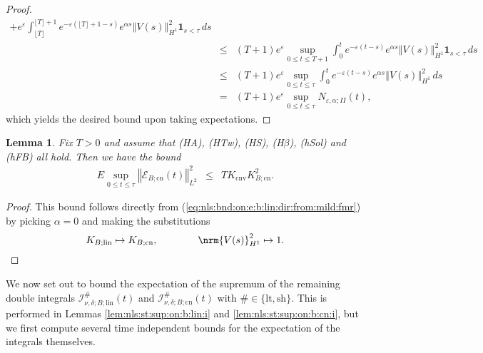 \documentclass[10pt]{articleHJ}
\newcommand{\e}{\ensuremath{\varepsilon}}
\renewcommand{\a}{\ensuremath{\alpha}}
\DeclarePairedDelimiter{\nrm}\lVert\rVert
\newcommand{\norm}[1]{\left\Vert#1\right\Vert}		%
\newcommand{\sref}[1]{(\ref{#1})}                       %
\newtheorem{lem}[thm]{Lemma}
\numberwithin{equation}{section}
\begin{document}
\begin{proof}
\begin{equation}
\begin{array}{lcl}
+
   e^{\e} \int_{\lfloor T \rfloor}^{\lfloor T \rfloor + 1}
       e^{ -\e(\lfloor T \rfloor +1 - s) } e^{ \alpha s}
       \norm{V(s)}_{H^1}^2 \mathbf{1}_{s < \tau}  \, ds
\\[0.2cm]
& \le &
  (T + 1)   e^{\e}
     \sup_{0 \le t \le T + 1}
      \int_0^t e^{-\e(t - s)} e^{\alpha s}
        \norm{V(s)}_{H^1}^2 \mathbf{1}_{s < \tau} \, ds
\\[0.2cm]
& \le &
  (T + 1)   e^{\e}
     \sup_{0 \le t \le \tau}
      \int_0^t e^{-\e(t - s)} e^{\alpha s}
        \norm{V(s)}_{H^1}^2  \, ds
\\[0.2cm]
& = &
  (T + 1)   e^{\e}
     \sup_{0 \le t \le \tau}
      N_{\e,\a;II}(t) ,
\end{array}
\end{equation}
which yields the desired bound upon taking expectations.
\end{proof}




\begin{lem}
\label{lem:nls:b:cn:sup:e}
Fix $T > 0$ and assume that (HA), (HTw), (HS),
(H$\beta$),
(hSol) and (hFB) all hold.
Then %
we have the bound
\begin{equation}
\begin{array}{lcl}
E \sup_{0 \le t \le \tau} \norm{\mathcal{E}_{B;\mathrm{cn}}(t )}_{L^2}^2
 & \le &  T K_{\mathrm{cnv}} K_{B;\mathrm{cn}}^2 .%
\end{array}
\end{equation}
\end{lem}
\begin{proof}
This bound follows directly from \sref{eq:nls:bnd:on:e:b:lin:dir:from:mild:fmr}
by picking
$\alpha = 0$
and making the substitutions
\begin{equation}
  K_{B;\mathrm{lin}} \mapsto K_{B;\mathrm{cn}},
  \qquad
  \qquad
    \nrm{V(s)}_{H^1}^2 \mapsto 1 .
\end{equation}
\end{proof}




We now set out to bound the expectation of the supremum of the remaining double integrals
$\mathcal{I}^{\#}_{\nu,\delta;B;\mathrm{lin}}(t)$
and $\mathcal{I}^{\#}_{\nu,\delta;B;\mathrm{cn}}(t)$ with $\# \in \{ \mathrm{lt} , \mathrm{sh} \}$.
This is performed in Lemmas \ref{lem:nls:st:sup:on:b:lin:i} and \ref{lem:nls:st:sup:on:b:cn:i}, 
but we first compute several time independent bounds for the expectation of the integrals themselves.
\end{document}
